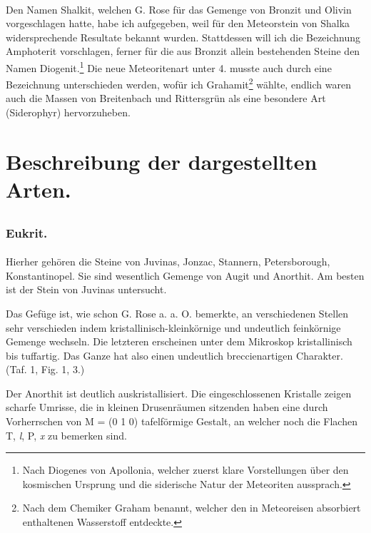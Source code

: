 \documentclass[a4paper, 12pt, oneside]{article}
\begin{document}
\paragraph*{}
Den Namen Shalkit, welchen G. Rose für das Gemenge von Bronzit und Olivin vorgeschlagen hatte, habe ich aufgegeben, weil für den Meteorstein von Shalka widersprechende Resultate bekannt wurden. Stattdessen will ich die Bezeichnung Amphoterit vorschlagen, ferner für die aus Bronzit allein bestehenden Steine den Namen Diogenit.\footnote{Nach Diogenes von Apollonia, welcher zuerst klare Vorstellungen über den kosmischen Ursprung und die siderische Natur der Meteoriten aussprach.} Die neue Meteoritenart unter 4. musste auch durch eine Bezeichnung unterschieden werden, wofür ich Grahamit\footnote{Nach dem Chemiker Graham benannt, welcher den in Meteoreisen absorbiert enthaltenen Wasserstoff entdeckte.} wählte, endlich waren auch die Massen von Breitenbach und Rittersgrün als eine besondere Art (Siderophyr) hervorzuheben.
\clearpage
\section{Beschreibung der dargestellten Arten.}
\subsection{}
\subsubsection{Eukrit.}
\paragraph{}
Hierher gehören die Steine von Juvinas, Jonzac, Stannern, Petersborough, Konstantinopel. Sie sind wesentlich Gemenge von Augit und Anorthit. Am besten ist der Stein von Juvinas untersucht.

Das Gefüge ist, wie schon G. Rose a. a. O. bemerkte, an verschiedenen Stellen sehr verschieden indem kristallinisch-kleinkörnige und undeutlich feinkörnige Gemenge wechseln. Die letzteren erscheinen unter dem Mikroskop kristallinisch bis tuffartig. Das Ganze hat also einen undeutlich breccienartigen Charakter. (Taf. 1, Fig. 1, 3.)

Der Anorthit ist deutlich auskristallisiert. Die eingeschlossenen Kristalle zeigen scharfe Umrisse, die in kleinen Drusenräumen sitzenden haben eine durch Vorherrschen von M = (0 1 0) tafelförmige Gestalt, an welcher noch die Flachen T, \emph{l}, P, \emph{x} zu bemerken sind.
\end{document}
